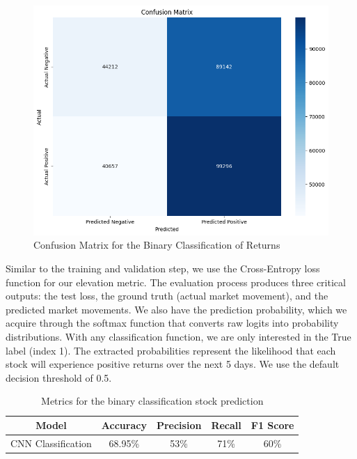 \documentclass[12pt]{article}
\begin{document}
\begin{figure}[h]
	\centering
	\includegraphics[width=.85\linewidth]{plots/confusion_matrix.png}
	\caption{Confusion Matrix for the Binary Classification of Returns}
	\label{fig:confusion_matrix}
\end{figure}

Similar to the training and validation step, we use the Cross-Entropy loss function for our elevation metric. The evaluation process produces three critical outputs: the test loss, the ground truth (actual market movement), and the predicted market movements. We also have the prediction probability, which we acquire through the softmax function that converts raw logits into probability distributions. With any classification function, we are only interested in the True label (index 1). The extracted probabilities represent the likelihood that each stock will experience positive returns over the next 5 days. We use the default decision threshold of 0.5.

\begin{table}[ht]
	\centering
	\caption{Metrics for the binary classification stock prediction}
	\begin{tabular}[t]{ccccc}
		\toprule
		Model & Accuracy & Precision & Recall & F1 Score \\
		\midrule
		CNN Classification & 68.95\% & 53\% & 71\% & 60\%  \\			
		\bottomrule
	\end{tabular}\label{tab:metrics}
\end{table}
\end{document}
